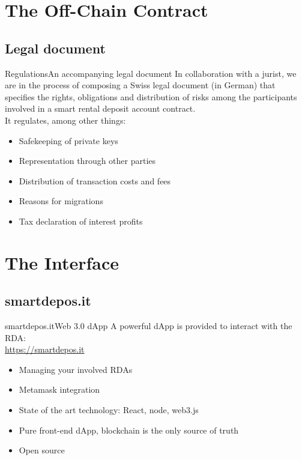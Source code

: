 \documentclass{beamer}
\begin{document}
\section{The Off-Chain Contract}

\subsection{Legal document}

\begin{frame}{Regulations}{An accompanying legal document}
	In collaboration with a jurist, we are in the process of composing a Swiss legal document (in German) that specifies the rights, obligations and distribution of risks among the participants involved in a smart rental deposit account contract. \pause \\ 
	It regulates, among other things:
	\vspace{1em}
	\begin{itemize}
		\item<2-> Safekeeping of private keys
		\item<2-> Representation through other parties
		\item<3-> Distribution of transaction costs and fees
		\item<3-> Reasons for migrations
		\item<4-> Tax declaration of interest profits
	\end{itemize}
\end{frame}


\section{The Interface}

\subsection{smartdepos.it}

\begin{frame}{smartdepos.it}{Web 3.0 dApp}
	A powerful dApp is provided to interact with the RDA: \\ 
	\vspace{1em}
	\url{https://smartdepos.it} \\
	\vspace{1em}
	\uncover<2->{It offers: \\}
	\begin{itemize}
		\item<2-> Managing your involved RDAs
		\item<3-> Metamask integration
		\item<4-> State of the art technology: React, node, web3.js
		\item<5-> Pure front-end dApp, blockchain is the only source of truth
		\item<6-> Open source
	\end{itemize}
\end{frame}
\end{document}
